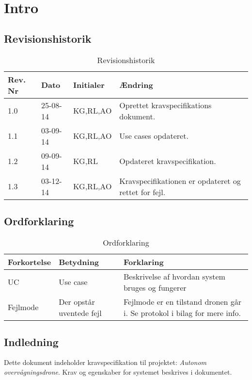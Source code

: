 \chapter{Intro}

\section{Revisionshistorik}
\begin{table}[H]
	\centering
		\begin{tabular}{|p{2 cm}|p{2 cm}|p{3 cm}|p{6 cm}|} 
		\hline
			\textbf{Rev. Nr} & \textbf{Dato}		& \textbf{Initialer} 	& \textbf{Ændring} \\ \hline
			1.0 	& 25-08-14	& KG,RL,AO		& Oprettet kravspecifikations \newline dokument.	\\ \hline
			1.1 	& 03-09-14	& KG,RL,AO		& Use cases opdateret.\\ \hline
			1.2 	& 09-09-14	& KG,RL			& Opdateret kravspecifikation.\\ \hline
			1.3 	& 03-12-14	& KG,RL,AO		& Kravspecifikationen er opdateret og rettet for fejl.\\ \hline
		\end{tabular}
	\caption{Revisionshistorik}
\end{table}

\vspace{1.5cm}

\section{Ordforklaring}
\begin{table}[H]
	\centering
		\begin{tabular}{|p{2.5cm}|p{4.5 cm}|p{6.5 cm}|} 
		\hline
			\textbf{Forkortelse} & \textbf{Betydning} & \textbf{Forklaring} \\ \hline
			UC & Use case & Beskrivelse af hvordan system bruges og fungerer \\ \hline
			Fejlmode & Der opstår uventede fejl & Fejlmode er en tilstand dronen går i. \newline Se protokol i bilag for mere info. \\ \hline
		\end{tabular}
	\caption{Ordforklaring}
\end{table}

\vspace{2cm}

\section{Indledning}

Dette dokument indeholder kravspecifikation til projektet: \textit{Autonom overvågningsdrone}. Krav og egenskaber for systemet beskrives i dokumentet.